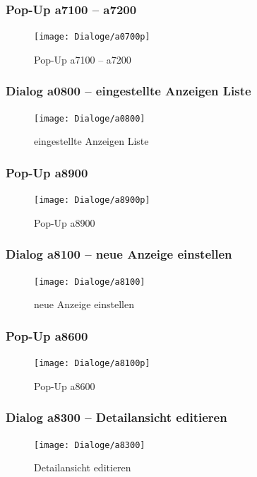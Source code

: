 \documentclass[a4paper,12pt,oneside]{scrartcl}
\begin{document}
\newpage
\subsubsection{Pop-Up a7100 – a7200}
\begin{figure}[!htbp]
\centering
\noindent\texttt{[image: Dialoge/a0700p]}
\caption{Pop-Up a7100 – a7200}
\end{figure}
\FloatBarrier

\newpage
\subsubsection{Dialog a0800 – eingestellte Anzeigen Liste}
\begin{figure}[!htbp]
\centering
\noindent\texttt{[image: Dialoge/a0800]}
\caption{eingestellte Anzeigen Liste}
\end{figure}
\FloatBarrier

\newpage
\subsubsection{Pop-Up a8900}
\begin{figure}[!htbp]
\centering
\noindent\texttt{[image: Dialoge/a8900p]}
\caption{Pop-Up a8900}
\end{figure}
\FloatBarrier

\newpage
\subsubsection{Dialog a8100 – neue Anzeige einstellen }
\begin{figure}[!htbp]
\centering
\noindent\texttt{[image: Dialoge/a8100]}
\caption{neue Anzeige einstellen}
\end{figure}
\FloatBarrier

\newpage
\subsubsection{Pop-Up a8600}
\begin{figure}[!htbp]
\centering
\noindent\texttt{[image: Dialoge/a8100p]}
\caption{Pop-Up a8600}
\end{figure}
\FloatBarrier

\newpage
\subsubsection{Dialog a8300 – Detailansicht editieren}
\begin{figure}[!htbp]
\centering
\noindent\texttt{[image: Dialoge/a8300]}
\caption{Detailansicht editieren}
\end{figure}
\FloatBarrier
\end{document}

